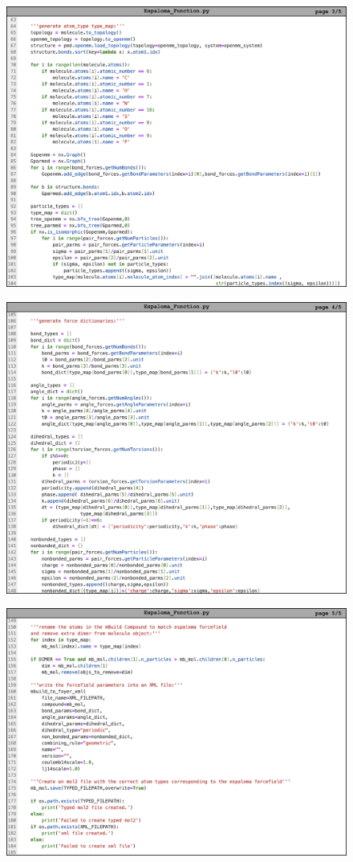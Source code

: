 \begin{figure}
    \centering
    \includegraphics[width=1\linewidth]{src/figures/FF_figs/esp3.png}
    \label{fig:esp3}
\end{figure}

\begin{figure}
    \centering
    \includegraphics[width=1\linewidth]{src/figures/FF_figs/esp4.png}
    \label{fig:esp4}
\end{figure}

\begin{figure}
    \centering
    \includegraphics[width=1\linewidth]{src/figures/FF_figs/esp5.png}
    \label{fig:esp5}
\end{figure}
